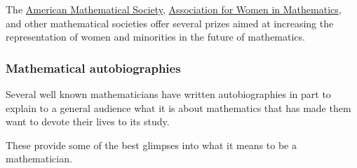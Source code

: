 \documentclass{article}
\begin{document}
%
The \href{https://en.wikipedia.org/wiki/American_Mathematical_Society}{American Mathematical Society}, \href{https://en.wikipedia.org/wiki/Association_for_Women_in_Mathematics}{Association for Women in Mathematics}, and other mathematical societies offer several prizes aimed at increasing the representation of women and minorities in the future of mathematics.

\subsubsection{Mathematical autobiographies}
Several well known mathematicians have written autobiographies in part to explain to a general audience what it is about mathematics that has made them want to devote their lives to its study.

These provide some of the best glimpses into what it means to be a mathematician.
\end{document}
